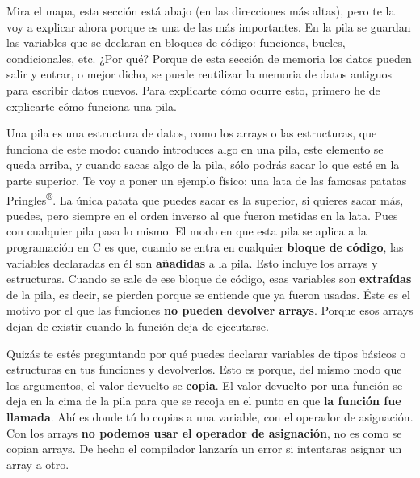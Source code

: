\documentclass[a4paper]{article}
\begin{document}
Mira el mapa, esta sección está abajo (en las direcciones más altas), pero
te la voy a explicar ahora porque es una de las más importantes. En la pila
se guardan las variables que se declaran en bloques de código: funciones,
bucles, condicionales, etc. ¿Por qué? Porque de esta sección de memoria los
datos pueden salir y entrar, o mejor dicho, se puede reutilizar la memoria
de datos antiguos para escribir datos nuevos. Para explicarte cómo ocurre esto,
primero he de explicarte cómo funciona una pila.

Una pila es una estructura de datos, como los arrays o las estructuras, que
funciona de este modo: cuando introduces algo en una pila, este elemento se
queda arriba, y cuando sacas algo de la pila, sólo podrás sacar lo que esté
en la parte superior. Te voy a poner un ejemplo físico: una lata de las famosas
patatas Pringles\textsuperscript{®}. La única patata que puedes sacar es la
superior, si quieres sacar más, puedes, pero siempre en el orden inverso al que
fueron metidas en la lata. Pues con cualquier pila pasa lo mismo.
El modo en que esta pila se aplica a la programación en C es que,
cuando se entra en cualquier
\textbf{bloque de código}, las variables declaradas en él son \textbf{añadidas}
a la pila. Esto incluye los arrays y estructuras. Cuando se sale de ese bloque
de código, esas variables son \textbf{extraídas} de la pila, es decir,
se pierden porque se entiende que ya fueron usadas. Éste es el motivo por el
que las funciones \textbf{no pueden devolver arrays}. Porque esos arrays
dejan de existir cuando la función deja de ejecutarse.

Quizás te estés
preguntando por qué puedes declarar
variables de tipos básicos o estructuras en tus funciones y
devolverlos. Esto es porque, del mismo modo que los argumentos, el valor
devuelto se \textbf{copia}. El valor devuelto por una función se deja
en la cima de la pila para que se recoja en el punto en que \textbf{la función
fue llamada}. Ahí es donde tú lo copias a una variable, con el operador
de asignación. Con los arrays \textbf{no podemos usar el operador de
asignación}, no es como se copian arrays. De hecho el compilador lanzaría un
error si intentaras asignar un array a otro.
\end{document}
